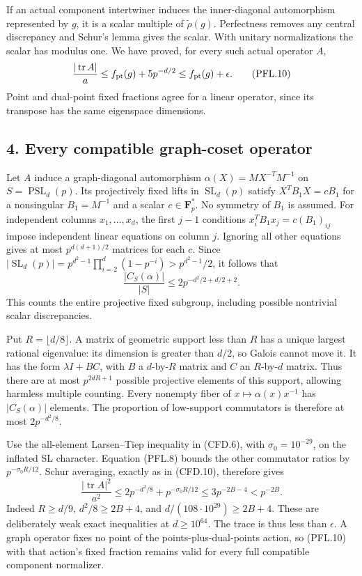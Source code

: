 If an actual component intertwiner induces the inner-diagonal
automorphism represented by \(g\), it is a scalar multiple of
\(\widetilde\rho(g)\). Perfectness removes any central discrepancy
and Schur's lemma gives the scalar. With unitary normalizations
the scalar has modulus one. We have proved, for every such
actual operator \(A\),
\[
           \frac{|\operatorname{tr}A|}{a}
                \le f_{\rm pt}(g)+5p^{-d/2}
                \le f_{\rm pt}(g)+\epsilon.
 \tag{PFL.10}
\]
Point and dual-point fixed fractions agree for a linear operator,
since its transpose has the same eigenspace dimensions.

\subsection*{4. Every compatible graph-coset operator}

Let \(A\) induce a graph-diagonal automorphism
\(\alpha(X)=M X^{-T}M^{-1}\) on
\(S=\operatorname{PSL}_d(p)\). Its projectively fixed lifts in
\(\operatorname{SL}_d(p)\) satisfy
\(X^T B_1X=cB_1\) for a nonsingular \(B_1=M^{-1}\) and a scalar
\(c\in\mathbf F_p^*\). No symmetry of \(B_1\) is assumed.
For independent columns \(x_1,\ldots,x_d\), the first \(j-1\)
conditions \(x_i^TB_1x_j=c(B_1)_{ij}\) impose independent linear
equations on column \(j\). Ignoring all other equations gives at
most \(p^{d(d+1)/2}\) matrices for each \(c\).
Since
\(|\operatorname{SL}_d(p)|=
p^{d^2-1}\prod_{i=2}^d(1-p^{-i})>p^{d^2-1}/2\), it follows that
\[
                   \frac{|C_S(\alpha)|}{|S|}
                     \le2p^{-d^2/2+d/2+2}.
 \tag{PFL.11}
\]
This counts the entire projective fixed subgroup, including
possible nontrivial scalar discrepancies.

Put \(R=\lfloor d/8\rfloor\). A matrix of geometric support
less than \(R\) has a unique largest rational eigenvalue:
its dimension is greater than \(d/2\), so Galois cannot move it.
It has the form \(\lambda I+BC\), with
\(B\) a \(d\)-by-\(R\) matrix and \(C\) an \(R\)-by-\(d\) matrix.
Thus there are at most \(p^{2dR+1}\) possible projective elements
of this support, allowing harmless multiple counting.
Every nonempty fiber of \(x\mapsto\alpha(x)x^{-1}\) has
\(|C_S(\alpha)|\) elements. The proportion of low-support
commutators is therefore at most \(2p^{-d^2/8}\).

Use the all-element Larsen--Tiep inequality in (CFD.6), with
\(\sigma_0=10^{-29}\), on the inflated SL character.
Equation (PFL.8) bounds the other commutator ratios by
\(p^{-\sigma_0R/12}\). Schur averaging, exactly as in (CFD.10),
therefore gives
\[
 \frac{|\operatorname{tr}A|^2}{a^2}
   \le2p^{-d^2/8}+p^{-\sigma_0R/12}
   \le3p^{-2B-4}<p^{-2B}.
 \tag{PFL.12}
\]
Indeed \(R\ge d/9\), \(d^2/8\ge2B+4\), and
\(d/(108\cdot10^{29})\ge2B+4\).
These are deliberately weak exact inequalities at \(d\ge10^{64}\).
The trace is thus less than \(\epsilon\).
A graph operator fixes no point of the points-plus-dual-points
action, so (PFL.10) with that action's fixed fraction remains
valid for every full compatible component normalizer.


